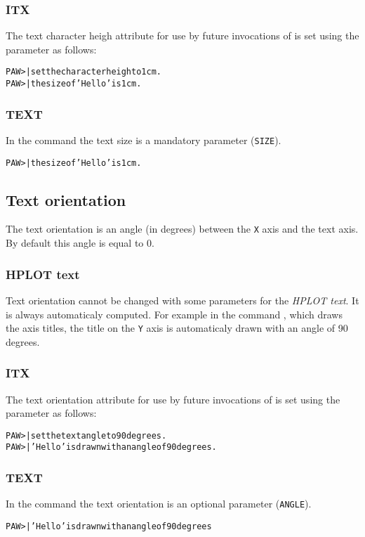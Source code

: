\subsubsection{ITX}
The text character heigh attribute for use by future invocations of 
 is set using the  parameter as follows:
\begin{alltt}
PAW >     | set the character heigh to 1 cm.
PAW >  | the size of 'Hello' is 1 cm.
\end{alltt}
\subsubsection{TEXT}
In the command  the text size is a mandatory parameter
(\texttt{SIZE}).
\begin{alltt}
PAW >  | the size of 'Hello' is 1 cm.
\end{alltt}

\subsection*{Text orientation}
The text orientation is an angle (in degrees) between the \texttt{X} axis
and the text axis. By default this angle is equal to 0.
\subsubsection{HPLOT text}
Text orientation cannot be changed with some  parameters for the
{\em HPLOT text}. It is always automaticaly computed. For example in
the command , which draws the axis titles, the title
on the \texttt{Y} axis is automaticaly drawn with an angle of 90 degrees.
\subsubsection{ITX}
The text orientation attribute for use by future invocations of 
 is set using the  parameter as follows:
\begin{alltt}
PAW >    | set the text angle to 90 degrees.
PAW >  | 'Hello' is drawn with an angle of 90 degrees.
\end{alltt}
\subsubsection{TEXT}
In the command  the text orientation is an optional parameter
(\texttt{ANGLE}).
\begin{alltt}
PAW >  | 'Hello' is drawn with an angle of 90 degrees
\end{alltt}

